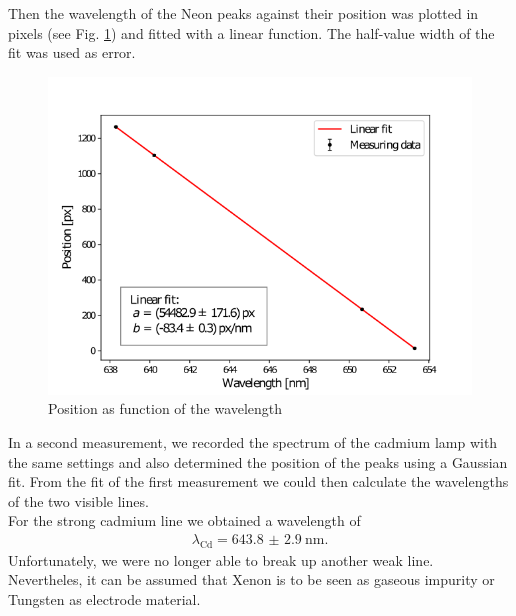 Then the wavelength of the Neon peaks against their position was plotted in pixels (see Fig. \ref{fig:position}) and fitted with a linear function.
The half-value width of the fit was used as error.
\begin{figure}[ht]
\centering
\includegraphics[scale=.55]{images//position.png}
\caption{Position as function of the wavelength}
\label{fig:position}
\end{figure}
In a second measurement, we recorded the spectrum of the cadmium lamp with the same settings and also determined the position of the peaks using a Gaussian fit.
From the fit of the first measurement we could then calculate the wavelengths of the two visible lines.\\
For the strong cadmium line we obtained a wavelength of
\begin{align*}
\lambda_\text{Cd}=\SI{643.8(29)}{\nano\meter}.
\end{align*}
Unfortunately, we were no longer able to break up another weak line.
Nevertheles, it can be assumed that Xenon is to be seen as gaseous impurity or Tungsten as electrode material.